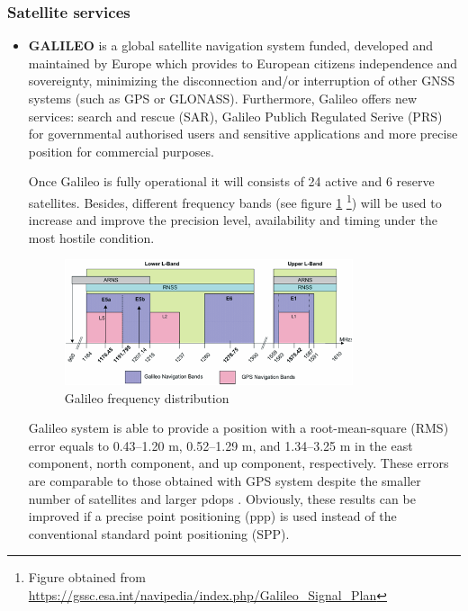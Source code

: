 \subsubsection{Satellite services}
\begin{itemize}
    \item \textbf{GALILEO} is a global satellite navigation system funded, developed and maintained by Europe which provides to European citizens independence and sovereignty, minimizing the disconnection and/or interruption of other GNSS systems (such as GPS or GLONASS). Furthermore, Galileo offers new services: search and rescue (SAR), Galileo Publich Regulated Serive (PRS) for governmental authorised users and sensitive applications and more precise position for commercial purposes.   
   
    Once Galileo is fully operational it will consists of 24 active and 6 reserve satellites. Besides, different frequency bands (see figure \ref{fig:frequency_plan} \footnote{Figure obtained from \url{https://gssc.esa.int/navipedia/index.php/Galileo_Signal_Plan}}) will be used to increase and improve the precision level, availability and timing under the most hostile condition. 
    
    \begin{figure}
    	\centering
    	\includegraphics[width=0.8\textwidth]{images/Galileo_Frequency_Plan.png}
    	\caption{Galileo frequency distribution}
    	\label{fig:frequency_plan}
    \end{figure} 
    
  Galileo system is able to provide a position with a root-mean-square (RMS) error equals to 0.43–1.20 m, 0.52–1.29 m, and 1.34–3.25 m in the east component, north component, and up component, respectively. These errors are comparable to those obtained with GPS system despite the smaller number of satellites and larger \gls{pdop}s \cite{Gal_pos}. Obviously, these results can be improved if a precise point positioning (\gls{ppp}) is used instead of the conventional standard point positioning (SPP). 


\end{itemize}

